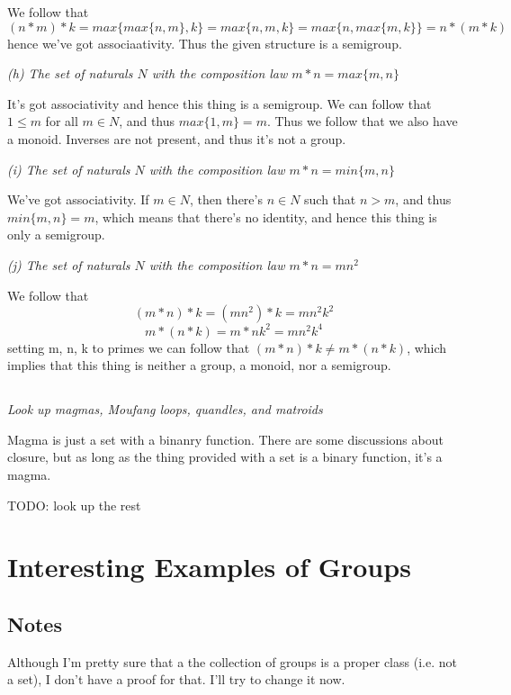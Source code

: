 \documentclass[11pt,oneside,titlepage]{book}
\newcommand{\set}[1]{\{ #1 \}}
\begin{document}
We follow that
$$(n * m) * k = max\set{max\set{n, m}, k} = max\set{n, m, k} = max\set{n, max\set{m, k}} = n * (m * k)$$
hence we've got associaativity. Thus the given structure is a
semigroup.

\textit{(h) The set of naturals $N$ with the composition law $m * n =
max\set{m, n}$}

It's got associativity and hence this thing is a semigroup. We can
follow that $1 \leq m$ for all $m \in N$, and thus $max\set{1, m} =
m$. Thus we follow that we also have a monoid. Inverses are not
present, and thus it's not a group.

\textit{(i) The set of naturals $N$ with the composition law $m * n =
min\set{m, n}$}

We've got associativity. If $m \in N$, then there's $n \in N$ such
that $n > m$, and thus $min\set{m, n} = m$, which means that there's
no identity, and hence this thing is only a semigroup.

\textit{(j) The set of naturals $N$ with the composition law $m * n =
mn^2$}

We follow that
$$(m * n) * k = (mn^2) * k = mn^2k^2$$
$$m * (n * k) = m * nk^2 = mn^2k^4$$
setting m, n, k to primes we can follow that $(m * n) * k \neq m * (n
* k)$, which implies that this thing is neither a group, a monoid, nor
a semigroup.

\subsection{}

\textit{Look up magmas, Moufang loops, quandles, and matroids}

Magma is just a set with a binanry function. There are some
discussions about closure, but as long as the thing provided with a
set is a binary function, it's a magma.

TODO: look up the rest

\section{Interesting Examples of Groups}

\subsection*{Notes}

Although I'm pretty sure that a the collection of groups is a proper
class (i.e. not a set), I don't have a proof for that. I'll try to
change it now.
\end{document}
